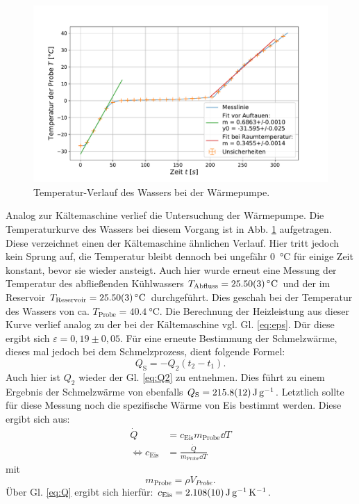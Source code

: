 	\begin{figure}[ht]
		\centering
		\includegraphics[width=\textwidth]{data/warm_machen.pdf}
		\caption{Temperatur-Verlauf des Wassers bei der Wärmepumpe.}
		\label{fig:Wärmepumpe}	
	\end{figure}
	Analog zur Kältemaschine verlief die Untersuchung der Wärmepumpe. 
	Die Temperaturkurve des Wassers bei diesem Vorgang ist in Abb. \ref{fig:Wärmepumpe} aufgetragen.
	Diese verzeichnet einen der Kältemaschine ähnlichen Verlauf.
	Hier tritt jedoch kein Sprung auf, die Temperatur bleibt dennoch bei ungefähr \SI{0}{\celsius} für einige Zeit konstant, bevor sie wieder ansteigt.
	Auch hier wurde erneut eine Messung der Temperatur des abfließenden Kühlwassers $T_\text{Abfluss} = \SI{25,5+-0,03}{\celsius}$ und der im Reservoir $T_\text{Reservoir} = \SI{25,5+-0,03}{\celsius}$ durchgeführt.
	Dies geschah bei der Temperatur des Wassers von ca. $T_\text{Probe} = \SI{40,4}{\celsius}$.
	Die Berechnung der Heizleistung aus dieser Kurve verlief analog zu der bei der Kältemaschine vgl. Gl. \ref{eq:eps}.
	Dür diese ergibt sich $\varepsilon = 0,19\pm 0,05$.
	Für eine erneute Bestimmung der Schmelzwärme, dieses mal jedoch bei dem Schmelzprozess, dient folgende Formel:
	\begin{equation} %
		Q_\text{S} = -Q_2 (t_2 - t_1).
	\end{equation} %
	Auch hier ist $Q_2$ wieder der Gl. \ref{eq:Q2} zu entnehmen. 
	Dies führt zu einem Ergebnis der Schmelzwärme von ebenfalls $Q_\text{S} = \SI{215.8+-1.2}{\joule\per\gram}$.
	Letztlich sollte für diese Messung noch die spezifische Wärme von Eis bestimmt werden.
	Diese ergibt sich aus:
	\begin{align}
		\dot{Q} &= c_\text{Eis} m_\text{Probe} \dd T\\
		\Leftrightarrow c_\text{Eis} &= \frac{\dot{Q}}{m_\text{Probe}\dd T}
	\end{align} %
	mit
	\begin{equation}
		m_\text{Probe} = \rho V_{Probe}.
	\end{equation} %
	Über Gl. \ref{eq:Q} ergibt sich hierfür: $c_\text{Eis}=\SI{2.108+-0.010}{\joule\per\gram\per\kelvin}$.
	
